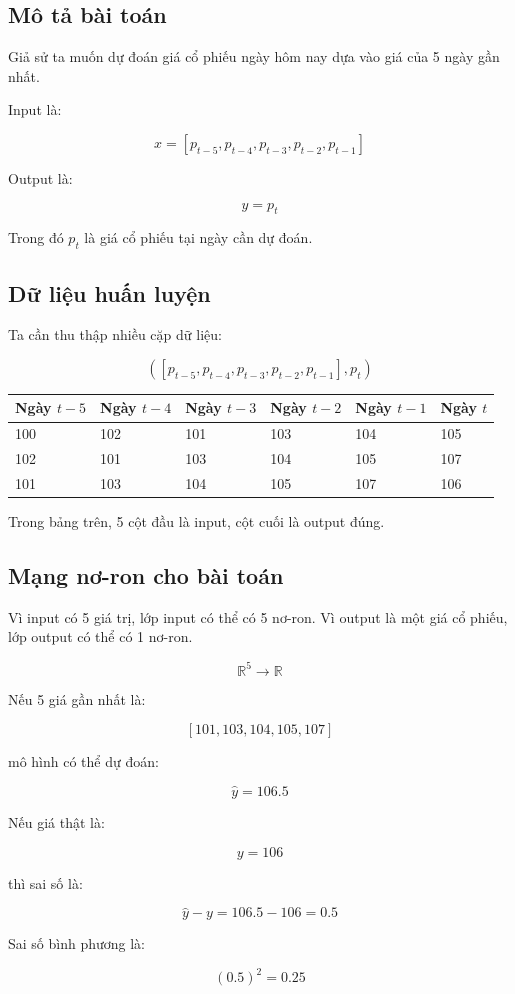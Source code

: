 \subsection{Mô tả bài toán}

Giả sử ta muốn dự đoán giá cổ phiếu ngày hôm nay dựa vào giá của 5 ngày gần nhất.

Input là:

\[
    x = [p_{t-5}, p_{t-4}, p_{t-3}, p_{t-2}, p_{t-1}]
\]

Output là:

\[
    y = p_t
\]

Trong đó $p_t$ là giá cổ phiếu tại ngày cần dự đoán.

\subsection{Dữ liệu huấn luyện}

Ta cần thu thập nhiều cặp dữ liệu:

\[
    ([p_{t-5},p_{t-4},p_{t-3},p_{t-2},p_{t-1}], p_t)
\]

\begin{center}
\begin{tabular}{llllll}
\toprule
Ngày $t-5$ & Ngày $t-4$ & Ngày $t-3$ & Ngày $t-2$ & Ngày $t-1$ & Ngày $t$ \\
\midrule
100 & 102 & 101 & 103 & 104 & 105 \\
102 & 101 & 103 & 104 & 105 & 107 \\
101 & 103 & 104 & 105 & 107 & 106 \\
\bottomrule
\end{tabular}
\end{center}

Trong bảng trên, 5 cột đầu là input, cột cuối là output đúng.

\subsection{Mạng nơ-ron cho bài toán}

Vì input có 5 giá trị, lớp input có thể có 5 nơ-ron. Vì output là một giá cổ phiếu, lớp output có thể có 1 nơ-ron.

\[
    \mathbb{R}^5 \rightarrow \mathbb{R}
\]

\begin{vidu}
Nếu 5 giá gần nhất là:

\[
    [101, 103, 104, 105, 107]
\]

mô hình có thể dự đoán:

\[
    \hat{y} = 106.5
\]

Nếu giá thật là:

\[
    y = 106
\]

thì sai số là:

\[
    \hat{y} - y = 106.5 - 106 = 0.5
\]

Sai số bình phương là:

\[
    (0.5)^2 = 0.25
\]
\end{vidu}

